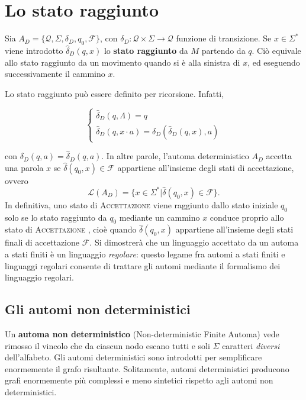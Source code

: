 \documentclass[10pt]{\classname}
\theoremstyle{newlinethm}
\theoremstyle{theorem}
\theoremstyle{definition}
\theoremstyle{definition}
\theoremstyle{definition}
\theoremstyle{definition}
\begin{document}
\section{Lo stato raggiunto}

Sia $A_D = \{ \mathcal Q, \Sigma, \delta_D, q_0, \mathcal F\}$, con $\delta_D:\mathcal Q \times \Sigma \rightarrow \mathcal Q$ funzione di transizione. Se $x\in
\Sigma^*$ viene introdotto $\hat{\delta}_D (q, x)$ lo \textbf{stato raggiunto} da
$M$ partendo da $q$. Ciò equivale allo stato raggiunto da un movimento quando
si è alla sinistra di $x$, ed eseguendo successivamente il cammino $x$.

Lo stato raggiunto può essere definito per ricorsione. Infatti,

$$
\left\{
    \begin{array}{l}
        \hat{\delta}_D (q, \Lambda) = q \\
        \hat{\delta}_D (q, x\cdot a) = \delta _D (\hat{\delta}_D (q, x), a)
    \end{array}
\right.
$$

con $\delta_D(q, a) = \hat{\delta}_D(q, a)$. In altre parole, l'automa deterministico $A_D$ accetta una
parola $x$ se $\hat{\delta}(q_0, x) \in \mathcal F$ appartiene all'insieme degli stati di
accettazione, ovvero $$\mathcal L(A_D) = \{x\in \Sigma^* | \hat{\delta}(q_0, x)
\in \mathcal F\}.$$ In definitiva, uno stato di \textsc{Accettazione } viene
raggiunto dallo stato iniziale $q_0$ solo se lo stato raggiunto da $q_0$
mediante un cammino $x$ conduce proprio allo stato di \textsc{Accettazione },
cioè quando $\hat{\delta}(q_0, x)$ appartiene all'insieme degli stati finali di
accettazione $\mathcal F$. Si dimostrerà che un linguaggio accettato da un automa a stati
finiti è un linguaggio \emph{regolare}: questo legame fra automi a stati finiti
e linguaggi regolari consente di trattare gli automi mediante il formalismo dei
linguaggio regolari.

\subsection{Gli automi non deterministici}

Un \textbf{automa non deterministico} (Non-deterministic Finite Automa) vede
rimosso il vincolo che da ciascun nodo escano tutti e soli $\Sigma$ caratteri
\emph{diversi} dell'alfabeto. Gli automi deterministici sono introdotti per
semplificare enormemente il grafo risultante. Solitamente, automi
deterministici producono grafi enormemente più complessi e meno sintetici
rispetto agli automi non deterministici.
\end{document}
